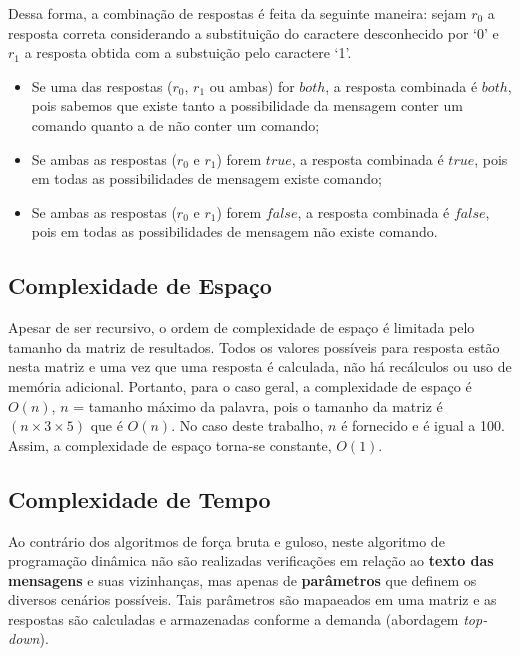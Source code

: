 \documentclass[a4paper,12pt,titlepage]{article}
\begin{document}
Dessa forma, a combinação de respostas é feita da seguinte maneira: sejam $r_0$ a resposta correta considerando a substituição do caractere desconhecido por `0' e $r_1$ a resposta obtida com a substuição pelo caractere `1'.

\begin{itemize}[leftmargin=1.6cm]
    \item Se uma das respostas ($r_0$, $r_1$ ou ambas) for $both$, a resposta combinada é $both$, pois sabemos que existe tanto a possibilidade da mensagem conter um comando quanto a de não conter um comando;
    \item Se ambas as respostas ($r_0$ e $r_1$) forem $true$, a resposta combinada é $true$, pois em todas as possibilidades de mensagem existe comando;
    \item Se ambas as respostas ($r_0$ e $r_1$) forem $false$, a resposta combinada é $false$, pois em todas as possibilidades de mensagem não existe comando.
    \ \\
\end{itemize}


\subsection{Complexidade de Espaço}

Apesar de ser recursivo, o ordem de complexidade de espaço é limitada pelo tamanho da matriz de resultados. Todos os valores possíveis para resposta estão nesta matriz e uma vez que uma resposta é calculada, não há recálculos ou uso de memória adicional. Portanto, para o caso geral, a complexidade de espaço é $O(n)$, $n$ = tamanho máximo da palavra, pois o tamanho da matriz é $(n \times 3 \times 5)$ que é $O(n)$. No caso deste trabalho, $n$ é fornecido e é igual a 100. Assim, a complexidade de espaço torna-se constante, $O(1)$.

\subsection{Complexidade de Tempo}

Ao contrário dos algoritmos de força bruta e guloso, neste algoritmo de programação dinâmica não são realizadas verificações em relação ao \textbf{texto das mensagens} e suas vizinhanças, mas apenas de \textbf{parâmetros} que definem os diversos cenários possíveis. Tais parâmetros são mapaeados em uma matriz e as respostas são calculadas e armazenadas conforme a demanda (abordagem \textit{top-down}).
\end{document}
